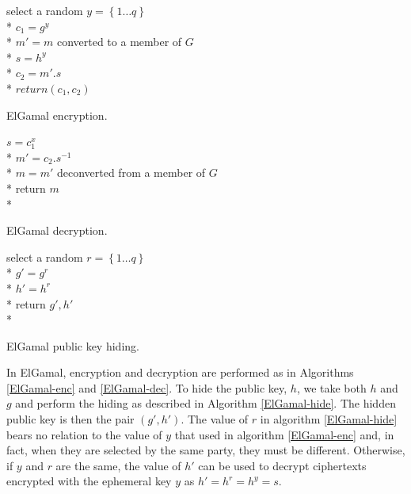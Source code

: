 \documentclass[ %
                    author={Luke Murray},
                supervisor={Dr. Simon Hollis},
                     title={Shadow Peer-to-Peer Networks},
                  subtitle={},
                    degree={MEng},
                      year={2013} ]{thesis}
\begin{document}
\begin{algorithm}[t]
    select a random $y = \left\{1 \ldots q\right\}$\\*
    $c_1 = g^{y}$\\*
    $m\prime = m$ converted to a member of $G$\\*
    $s = h^{y}$\\*
    $c_2 = m\prime.s$\\*
    $return (c_1, c_2)$
\caption{ElGamal encryption.}
\label{ElGamal-enc}
\end{algorithm}
\begin{algorithm}[t]
    $s = c_1^{x}$\\*
    $m\prime = c_2.s^{-1}$\\*
    $m = m\prime$ deconverted from a member of $G$\\*
    return $m$\\*
\caption{ElGamal decryption.}
\label{ElGamal-dec}
\end{algorithm}
\begin{algorithm}[t]
    select a random $r = \left\{1 \ldots q\right\}$\\*
    $g\prime = g^{r}$\\*
    $h\prime = h^{r}$\\*
    return $g\prime,h\prime$\\*
\caption{ElGamal public key hiding.}
\label{ElGamal-hide}
\end{algorithm}

In ElGamal, encryption and decryption are performed as in Algorithms \ref{ElGamal-enc} and \ref{ElGamal-dec}. To hide the public key, $h$, we take both $h$ and $g$ and perform the hiding as described in Algorithm \ref{ElGamal-hide}. The hidden public key is then the pair $(g\prime, h\prime)$. The value of $r$ in algorithm \ref{ElGamal-hide} bears no relation to the value of $y$ that used in algorithm \ref{ElGamal-enc} and, in fact, when they are selected by the same party, they must be different. Otherwise, if $y$ and $r$ are the same, the value of $h\prime$ can be used to decrypt ciphertexts encrypted with the ephemeral key $y$ as $h\prime = h^{r} = h^{y} = s$.
\end{document}

